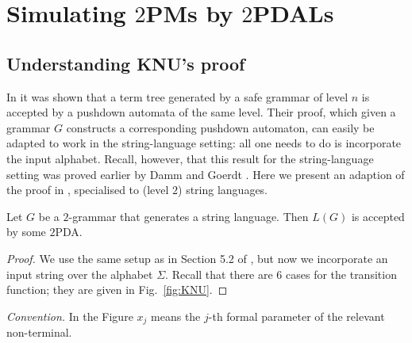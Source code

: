 \section{Simulating $2$PMs by $2$PDALs}

\subsection{Understanding KNU's proof}

In \cite{KNU02} it was shown that a term tree generated by a safe
grammar of level $n$ is accepted by a pushdown automata of the
same level. Their proof, which given a grammar $G$ constructs a
corresponding pushdown automaton, can easily be adapted to work in
the string-language setting: all one needs to do is incorporate
the input alphabet. Recall, however, that this result for the
string-language setting was proved earlier by Damm and Goerdt
\cite{DG86}. Here we present an adaption of the proof in \cite{KNU02},
specialised to (level $2$) string languages.

\begin{theorem} Let $G$ be a $2$-grammar that generates a string
language. Then $L(G)$ is accepted by some $2$PDA.
\end{theorem}

\begin{proof}
We use the same setup as in Section 5.2 of \cite{KNU02}, but now we
incorporate an input string over the alphabet $\Sigma$. Recall that
there are 6 cases for the transition function; they are given in
Fig.~\ref{fig:KNU}.
\end{proof}

\begin{figure*}[t]
\begin{center}
\caption{Adapted transition rules from \cite{KNU02}\label{fig:KNU}}
\end{center}
\noindent\emph{Convention.} In the Figure $x_j$ means the $j$-th
formal parameter of the relevant non-terminal.
\end{figure*}

